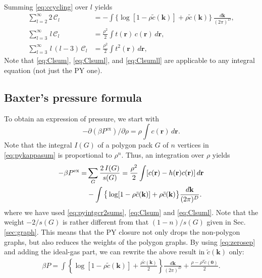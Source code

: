 \documentclass[notitlepage,preprint]{revtex4-1}
\newcommand{\vct}[1]{\mathbf{#1}}
\providecommand{\vr}{} %
\renewcommand{\vr}{\vct{r}}
\newcommand{\vk}{\vct{k}}
\newcommand{\dvk}{\frac{d\vk}{(2\pi)^D}}
\newcommand{\supex}[1]{ { { #1 }^{ \mathrm{ex} } } }
\newcommand{\Pex}{\supex{P}}
\newcommand{\Chn}{\mathscr{C}}
\begin{document}
Summing \eqref{eq:ccycling} over $l$ yields
%
\begin{align}
     \sum_{l=2}^{\infty} 2 \, \Chn_l
  &= -\int \Big\{
              \log[ 1 - \rho \tilde{c}(\vk) ]
            + \rho \tilde{c}(\vk)
           \Big\}\, \dvk,
     \label{eq:Clsum} \\
      \sum_{l=3}^{\infty} \, l \, \Chn_l
  &=
      \frac{ \rho^2 }{2} \int t(\vr) \, c(\vr) \, d\vr,
      \label{eq:Clsuml} \\
      \sum_{l=3}^{\infty} \, l \, (l - 3) \, \Chn_l
  &=  \frac{ \rho^2 }{ 2 }
      \int t^2(\vr) \, d\vr,
\label{eq:Clsumll}
\end{align}
%
Note that \eqref{eq:Clsum}, \eqref{eq:Clsuml}, and \eqref{eq:Clsumll}
  are applicable to any integral equation (not just the PY one).




\subsection*{Baxter's pressure formula}


%
To obtain an expression of pressure,
  we start with\cite{hansen}
%
\begin{equation}
  -\partial (\beta P^{\mathrm{ex}}) / \partial \rho
  = \rho \int c(\vr) \, d\vr.
\label{eq:crcompr}
\end{equation}
%
%
Note that
  the integral $I(G)$ of a polygon pack $G$ of $n$ vertices
  in \eqref{eq:pykappasum}
  is proportional to $\rho^n$.
%
Thus, an integration over $\rho$ yields\cite{baxterpressure}
%
\begin{align}
      -\beta \Pex
  =&  \sum_{G} \frac{ 2 \, I(G) }{ s(G) }
  =   \frac{ \rho^2 }{ 2 }
      \int [c(\vr) - h(\vr) c(\vr)] \, d\vr \notag \\
  &
      -\int \big\{
        \log[1 - \rho \tilde{c}(\vk)] + \rho \tilde{c}(\vk)
        \big\} \dvk.
\label{eq:baxterpressure}
\end{align}
%
where we have used
\eqref{eq:pyintgcr2sums}, \eqref{eq:Clsum} and \eqref{eq:Clsuml}.
%
Note that the weight $-2/s(G)$ is rather different
  from that $(1-n)/s(G)$ given in Sec. \ref{sec:graph}.
%
This means that the PY closure not only drops the non-polygon graphs,
  but also reduces the weights of the polygon graphs.
%
By using \eqref{eq:zerosep} and adding the ideal-gas part,
  we can rewrite the above result in $\tilde{c}(\vk)$ only:
%
\begin{align*}
      \beta P
    =
      \int \left\{
            \log[1 - \rho \tilde{c}(\vk)]
            + \frac{\rho \tilde{c}(\vk)}{2}
           \right\} \dvk
     +\frac{ \rho - \rho^2 \tilde{c}(\vct0) }{2}.
\end{align*}
%
\end{document}
